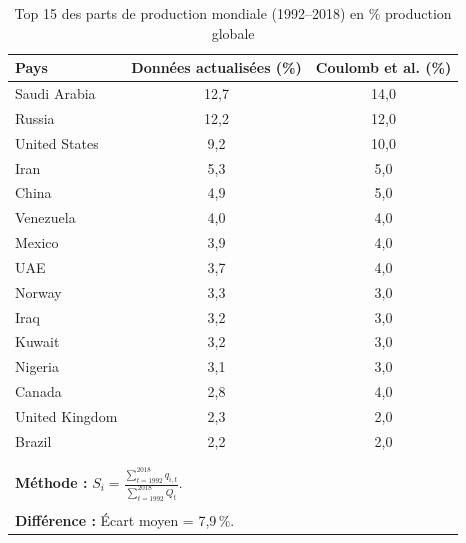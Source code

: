 \documentclass[11pt]{article}
\begin{document}
\begin{table}[htbp]
\centering
\caption{Top 15 des parts de production mondiale (1992--2018) en \% production globale}
\label{tab:prod_shares}
\begin{tabular}{lcc}
\toprule
\textbf{Pays} & \textbf{Données actualisées (\%)} & \textbf{Coulomb et al. (\%)} \\
\midrule
Saudi Arabia & 12{,}7 & 14{,}0 \\
Russia & 12{,}2 & 12{,}0 \\
United States & 9{,}2 & 10{,}0 \\
Iran & 5{,}3 & 5{,}0 \\
China & 4{,}9 & 5{,}0 \\
Venezuela & 4{,}0 & 4{,}0 \\
Mexico & 3{,}9 & 4{,}0 \\
UAE & 3{,}7 & 4{,}0 \\
Norway & 3{,}3 & 3{,}0 \\
Iraq & 3{,}2 & 3{,}0 \\
Kuwait & 3{,}2 & 3{,}0 \\
Nigeria & 3{,}1 & 3{,}0 \\
Canada & 2{,}8 & 4{,}0 \\
United Kingdom & 2{,}3 & 2{,}0 \\
Brazil & 2{,}2 & 2{,}0 \\
\bottomrule \\ \\ 

\multicolumn{3}{l}{\small \textbf{Méthode :} $S_i = \frac{\sum_{t=1992}^{2018} q_{i,t}}{\sum_{t=1992}^{2018} Q_t}$.} \\ \\

\multicolumn{3}{l}{\small \textbf{Différence :} Écart moyen = 7{,}9\,\%.} \\
\end{tabular}
\end{table}
\end{document}
